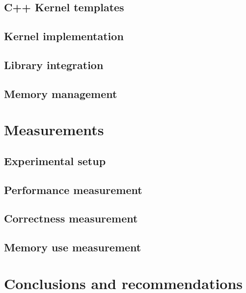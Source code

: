 \documentclass[11pt,twoside]{ce}
\begin{document}
\section{C++ Kernel templates}


\section{Kernel implementation}


\section{Library integration}


\section{Memory management}


\chapter{Measurements}
\label{chap:measurements}


\section{Experimental setup}


\section{Performance measurement}


\section{Correctness measurement}


\section{Memory use measurement}


\chapter{Conclusions and recommendations}
\label{chap:ccl}

\end{document}
